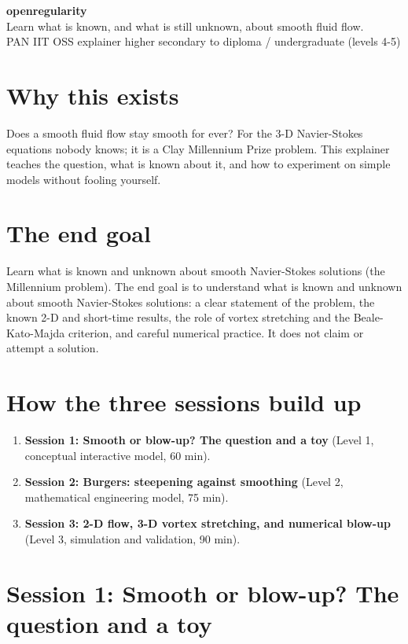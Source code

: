 \documentclass[11pt,a4paper]{article}
\begin{document}
\begin{center}{\LARGE\bfseries openregularity}\\[0.4em]{\large Learn what is known, and what is still unknown, about smooth fluid flow.}\\[0.2em]\small PAN IIT OSS explainer \textbullet{} higher secondary to diploma / undergraduate (levels 4-5)\end{center}

\section*{Why this exists}
Does a smooth fluid flow stay smooth for ever? For the 3-D Navier-Stokes equations nobody knows; it is a Clay Millennium Prize problem. This explainer teaches the question, what is known about it, and how to experiment on simple models without fooling yourself.

\section*{The end goal}
Learn what is known and unknown about smooth Navier-Stokes solutions (the Millennium problem). The end goal is to understand what is known and unknown about smooth Navier-Stokes solutions: a clear statement of the problem, the known 2-D and short-time results, the role of vortex stretching and the Beale-Kato-Majda criterion, and careful numerical practice. It does not claim or attempt a solution.

\section*{How the three sessions build up}
\begin{enumerate}[nosep]
\item \textbf{Session 1: Smooth or blow-up? The question and a toy} (Level 1, conceptual interactive model, 60 min).
\item \textbf{Session 2: Burgers: steepening against smoothing} (Level 2, mathematical engineering model, 75 min).
\item \textbf{Session 3: 2-D flow, 3-D vortex stretching, and numerical blow-up} (Level 3, simulation and validation, 90 min).
\end{enumerate}

\section{Session 1: Smooth or blow-up? The question and a toy}
\end{document}
